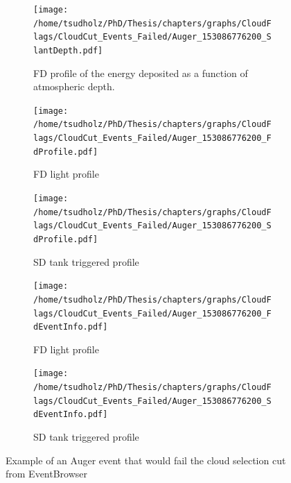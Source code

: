 \begin{figure}[!p]
\centering
 \vspace{2cm}
  \begin{subfigure}[b]{\textwidth}
  \centering
  \texttt{[image: /home/tsudholz/PhD/Thesis/chapters/graphs/CloudFlags/CloudCut\_Events\_Failed/Auger\_153086776200\_SlantDepth.pdf]}
  \caption{FD profile of the energy deposited as a function of atmospheric depth.}
  \end{subfigure}
 \vspace{0.5cm}
  \begin{subfigure}[b]{0.45\textwidth}
  	\centering
  	\texttt{[image: /home/tsudholz/PhD/Thesis/chapters/graphs/CloudFlags/CloudCut\_Events\_Failed/Auger\_153086776200\_FdProfile.pdf]}
  	\caption{FD light profile}
  \end{subfigure}
  \begin{subfigure}[b]{0.45\textwidth}
  	\centering
  	\texttt{[image: /home/tsudholz/PhD/Thesis/chapters/graphs/CloudFlags/CloudCut\_Events\_Failed/Auger\_153086776200\_SdProfile.pdf]}
  	\caption{SD tank triggered profile}
  \end{subfigure}

  \begin{subfigure}[b]{0.45\textwidth}
  	\centering
	\texttt{[image: /home/tsudholz/PhD/Thesis/chapters/graphs/CloudFlags/CloudCut\_Events\_Failed/Auger\_153086776200\_FdEventInfo.pdf]}
  	\caption{FD light profile}
  \end{subfigure}
  \begin{subfigure}[b]{0.45\textwidth}
  	\centering
	\texttt{[image: /home/tsudholz/PhD/Thesis/chapters/graphs/CloudFlags/CloudCut\_Events\_Failed/Auger\_153086776200\_SdEventInfo.pdf]}
  	\caption{SD tank triggered profile}
  \end{subfigure}
  \caption{Example of an Auger event that would fail the cloud selection cut from EventBrowser}
\end{figure}



